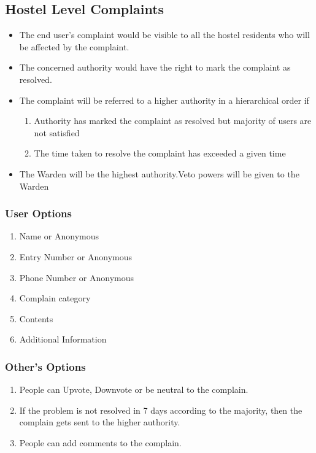 \documentclass{article}
\begin{document}
		\subsection{Hostel Level Complaints}
		\begin{itemize}
		\item The end user's complaint would be visible to all the hostel residents who will be affected by the complaint.
		\item The concerned authority would have the right to mark the complaint as resolved.
		\item The complaint will be referred to a higher authority in a hierarchical order if 
			\begin{enumerate}
			\item Authority has marked the complaint as resolved but majority of users are not satisfied
			\item The time taken to resolve the complaint has exceeded a given time
			\end{enumerate}
		\item The Warden will be the highest authority.Veto powers will be given to the Warden
		\end{itemize}
			\subsubsection{User Options}
				\begin{enumerate}
					\item Name or Anonymous
					\item Entry Number or Anonymous 
					\item Phone Number or Anonymous
					\item Complain category
					\item Contents
					\item Additional Information
				\end{enumerate}
			\subsubsection{Other's Options}
				\begin{enumerate}
					\item People can Upvote, Downvote or be neutral to the complain.
					\item If the problem is not resolved in 7 days according to the majority, then the complain gets sent to the higher authority.
					\item People can add comments to the complain.
				\end{enumerate}
\end{document}
